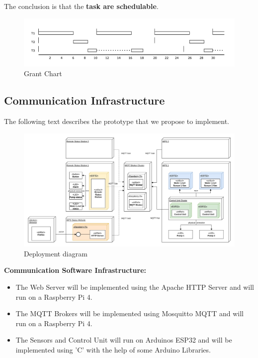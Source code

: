 \documentclass[11pt]{article}
\begin{document}
The conclusion is that the \textbf{task are schedulable}.

\begin{figure}[H]
  \centering
  \includegraphics[width=\linewidth]{../diagrams/rt-grant-chart.jpg}
  \caption{Grant Chart}
  \label{fig:Grant Chart}
\end{figure}

\newpage
\subsection{Communication Infrastructure}

The following text describes the prototype that we propose to implement. 

\begin{figure}[H]
  \centering
  \includegraphics[width=\linewidth]{../diagrams/deployment-diagram-WPS.jpg}
  \caption{Deployment diagram}
  \label{fig:Deployment Diagram}
\end{figure}

\textbf{Communication Software Infrastructure:}

\begin{itemize}
	\item The Web Server will be implemented using the Apache HTTP Server and will run on a Raspberry Pi 4.
	\item The MQTT Brokers will be implemented using Mosquitto MQTT and will run on a Raspberry Pi 4.
	\item The Sensors and Control Unit will run on Arduinos ESP32 and will be implemented using 'C' with the help of some Arduino Libraries. 
\end{itemize}
\end{document}
